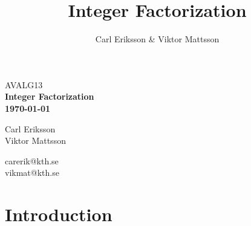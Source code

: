 \documentclass[a4paper,12pt]{article}
\author{Carl Eriksson & Viktor Mattsson}
\begin{document}
\title{Integer Factorization}

	\begin{titlepage}
    	\centering
    	\small
    	AVALG13\\
    	\vspace*{6\baselineskip}
    	\Large
    	\bfseries
    	Integer Factorization\\
    	\normalsize
        \textbf{\today} \\[2\baselineskip]

        \begin{minipage}{0.4\textwidth}
        \begin{flushleft} 
        Carl Eriksson\\
        Viktor Mattsson\\
        \end{flushleft}
        \end{minipage}
        \begin{minipage}{0.25\textwidth}
        \begin{flushleft} 
        carerik@kth.se\\
        vikmat@kth.se\\
        \end{flushleft}
        \end{minipage}

        \vspace*{10\baselineskip}
    \end{titlepage}

    \newpage

    \tableofcontents

    \newpage

    \section{Introduction}
        





\end{document}
